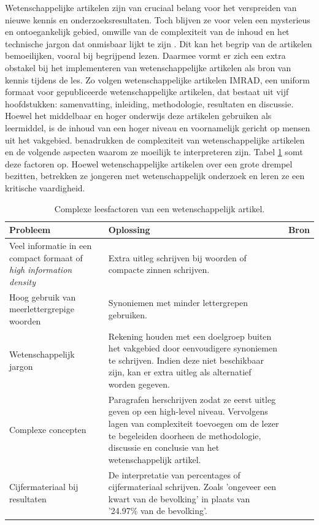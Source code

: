 Wetenschappelijke artikelen zijn van cruciaal belang voor het verspreiden van nieuwe kennis en onderzoeksresultaten. Toch blijven ze voor velen een mysterieus en ontoegankelijk gebied, omwille van de complexiteit van de inhoud en het technische jargon dat onmisbaar lijkt te zijn \autocite{Ball2017}. Dit kan het begrip van de artikelen bemoeilijken, vooral bij begrijpend lezen. Daarmee vormt er zich een extra obstakel bij het implementeren van wetenschappelijke artikelen als bron van kennis tijdens de les. Zo volgen wetenschappelijke artikelen IMRAD, een uniform formaat voor gepubliceerde wetenschappelijke artikelen, dat bestaat uit vijf hoofdstukken: samenvatting, inleiding, methodologie, resultaten en discussie. Hoewel het middelbaar en hoger onderwijs deze artikelen gebruiken als leermiddel, is  de inhoud van een hoger niveau en voornamelijk gericht op mensen uit het vakgebied. \textcite{Pain2016, CAS2021} benadrukken de complexiteit van wetenschappelijke artikelen en de volgende aspecten waarom ze moeilijk te interpreteren zijn. Tabel \ref{table:scientific-paper-struggles} somt deze factoren op. Hoewel wetenschappelijke artikelen over een grote drempel bezitten, betrekken ze jongeren met wetenschappelijk onderzoek en leren ze een kritische vaardigheid. 

\begin{center}
	\begin{table}[H]
	\begin{tabular}{| m{4cm} | m{8cm} | m{3cm} | }
		\hline
		\textbf{Probleem} & \textbf{Oplossing} & Bron \\
		\hline
		Veel informatie in een compact formaat of \textit{high information density} & Extra uitleg schrijven bij woorden of compacte zinnen schrijven. & \autocite{Matarese2013, PlavenSigray2017} \\
		\hline
		Hoog gebruik van meerlettergrepige woorden & Synoniemen met minder lettergrepen gebruiken. & \autocite{Siddharthan2006} \\
		\hline
		Wetenschappelijk jargon & Rekening houden met een doelgroep buiten het vakgebied door eenvoudigere synoniemen te schrijven. Indien deze niet beschikbaar zijn, kan er extra uitleg als alternatief worden gegeven. & \autocite{PlavenSigray2017} \\
		\hline
		Complexe concepten & Paragrafen herschrijven zodat ze eerst uitleg geven op een high-level niveau. Vervolgens lagen van complexiteit toevoegen om de lezer te begeleiden doorheen de methodologie, discussie en conclusie van het wetenschappelijk artikel. & \autocite{Pain2016} \\ 
		\hline
		Cijfermateriaal bij resultaten & De interpretatie van percentages of cijfermateriaal schrijven. Zoals 'ongeveer een kwart van de bevolking' in plaats van '24.97\% van de bevolking'. & \autocite{PlavenSigray2017} \\
		\hline
	\end{tabular}
	\caption{Complexe leesfactoren van een wetenschappelijk artikel.}
	\label{table:scientific-paper-struggles}
	\end{table}
\end{center}


